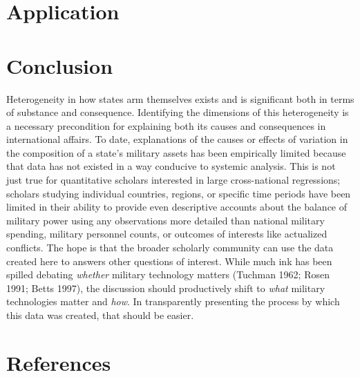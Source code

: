 \documentclass[
]{article}
\begin{document}
\hypertarget{application}{%
\section{Application}\label{application}}

\hypertarget{conclusion}{%
\section{Conclusion}\label{conclusion}}

Heterogeneity in how states arm themselves exists and is significant both in terms of substance and consequence. Identifying the dimensions of this heterogeneity is a necessary precondition for explaining both its causes and consequences in international affairs. To date, explanations of the causes or effects of variation in the composition of a state's military assets has been empirically limited because that data has not existed in a way conducive to systemic analysis. This is not just true for quantitative scholars interested in large cross-national regressions; scholars studying individual countries, regions, or specific time periods have been limited in their ability to provide even descriptive accounts about the balance of military power using any observations more detailed than national military spending, military personnel counts, or outcomes of interests like actualized conflicts. The hope is that the broader scholarly community can use the data created here to answers other questions of interest. While much ink has been spilled debating \textit{whether} military technology matters (Tuchman 1962; Rosen 1991; Betts 1997), the discussion should productively shift to \textit{what} military technologies matter and \textit{how}. In transparently presenting the process by which this data was created, that should be easier.

\newpage

\hypertarget{references}{%
\section*{References}\label{references}}
\end{document}
